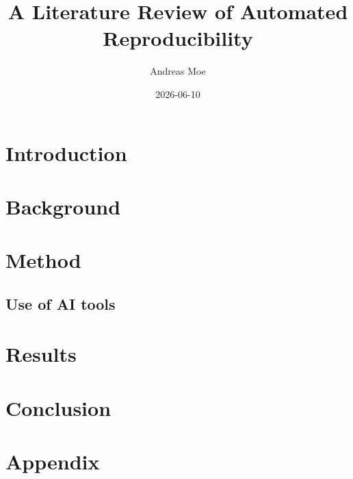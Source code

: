 \documentclass[8pt,a4paper]{article}
\title{A Literature Review of Automated Reproducibility}
\author{Andreas Moe}
\date{2026-06-10}
\begin{document}
\maketitle

\section{Introduction}


\section{Background}

\section{Method}

\subsection{Use of AI tools}

\section{Results}


\section{Conclusion}

\printbibliography

\newpage
\section*{Appendix}
\end{document}
